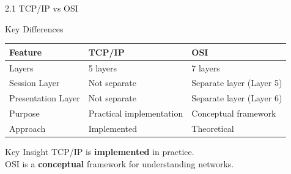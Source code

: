 \documentclass{beamer}
\begin{document}
	\begin{frame}{2.1 TCP/IP vs OSI}
		\begin{block}{Key Differences}
			\begin{tabular}{|p{2.5cm}|p{4cm}|p{4.5cm}|}
				\hline
				\textbf{Feature} & \textbf{TCP/IP} & \textbf{OSI} \\
				\hline
				Layers & 5 layers & 7 layers \\
				\hline
				Session Layer & Not separate & Separate layer (Layer 5) \\
				\hline
				Presentation Layer & Not separate & Separate layer (Layer 6) \\
				\hline
				Purpose & Practical implementation & Conceptual framework \\
				\hline
				Approach & Implemented & Theoretical \\
				\hline
			\end{tabular}
		\end{block}
		
		\begin{exampleblock}{Key Insight}
			TCP/IP is \textbf{implemented} in practice. \\
			OSI is a \textbf{conceptual} framework for understanding networks.
		\end{exampleblock}
	\end{frame}
	
\end{document}
